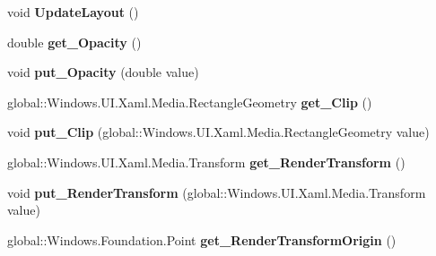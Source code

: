 \begin{DoxyCompactItemize}
void {\bfseries Update\+Layout} ()
\item 
\mbox{\label{interface_windows_1_1_u_i_1_1_xaml_1_1_i_u_i_element_ac73e763417220d829b8a2b5951828438}} 
double {\bfseries get\+\_\+\+Opacity} ()
\item 
\mbox{\label{interface_windows_1_1_u_i_1_1_xaml_1_1_i_u_i_element_a12fcaa6862ab54ca2e8c1537879d0fd8}} 
void {\bfseries put\+\_\+\+Opacity} (double value)
\item 
\mbox{\label{interface_windows_1_1_u_i_1_1_xaml_1_1_i_u_i_element_a3ac32c6dc006288e8edab536fce2cba9}} 
global\+::\+Windows.\+U\+I.\+Xaml.\+Media.\+Rectangle\+Geometry {\bfseries get\+\_\+\+Clip} ()
\item 
\mbox{\label{interface_windows_1_1_u_i_1_1_xaml_1_1_i_u_i_element_afa52f92cfbfffd55b51a14f0f3174ebb}} 
void {\bfseries put\+\_\+\+Clip} (global\+::\+Windows.\+U\+I.\+Xaml.\+Media.\+Rectangle\+Geometry value)
\item 
\mbox{\label{interface_windows_1_1_u_i_1_1_xaml_1_1_i_u_i_element_ab552e7826e0d2d6d3c836b38db536820}} 
global\+::\+Windows.\+U\+I.\+Xaml.\+Media.\+Transform {\bfseries get\+\_\+\+Render\+Transform} ()
\item 
\mbox{\label{interface_windows_1_1_u_i_1_1_xaml_1_1_i_u_i_element_ac1ee0a38d70af19ef1629dff46ef59aa}} 
void {\bfseries put\+\_\+\+Render\+Transform} (global\+::\+Windows.\+U\+I.\+Xaml.\+Media.\+Transform value)
\item 
\mbox{\label{interface_windows_1_1_u_i_1_1_xaml_1_1_i_u_i_element_a5fa81294c9c6de8e157213ee727bd1c2}} 
global\+::\+Windows.\+Foundation.\+Point {\bfseries get\+\_\+\+Render\+Transform\+Origin} ()
\item 
\mbox{\label{interface_windows_1_1_u_i_1_1_xaml_1_1_i_u_i_element_a05d8af2ba53053be8810ef8ca2e32f36}} 

\end{DoxyCompactItemize}
